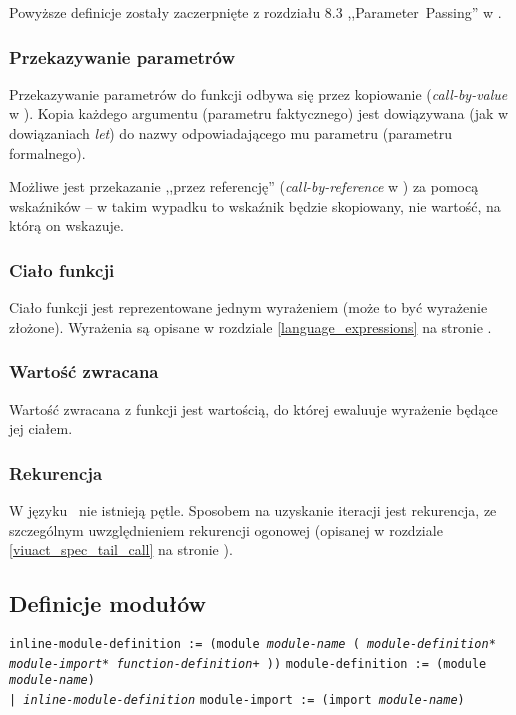 Powyższe definicje zostały zaczerpnięte z rozdziału 8.3 ,,Parameter~Passing'' w
\cite{ProgrammingLanguagePragmatics}.

\subsubsection{Przekazywanie parametrów}

Przekazywanie parametrów do funkcji odbywa się przez kopiowanie
(\emph{call-by-value} w \cite{ProgrammingLanguagePragmatics}). Kopia każdego
argumentu (parametru faktycznego) jest dowiązywana (jak w dowiązaniach
\emph{let}) do nazwy odpowiadającego mu parametru (parametru formalnego).

Możliwe jest przekazanie ,,przez referencję'' (\emph{call-by-reference} w
\cite{ProgrammingLanguagePragmatics}) za pomocą wskaźników -- w takim wypadku to
wskaźnik będzie skopiowany, nie wartość, na którą on wskazuje.

\subsubsection{Ciało funkcji}

Ciało funkcji jest reprezentowane jednym wyrażeniem (może to być wyrażenie
złożone). Wyrażenia są opisane w rozdziale \ref{language_expressions} na stronie
\pageref{language_expressions}.

\subsubsection{Wartość zwracana}

Wartość zwracana z funkcji jest wartością, do której ewaluuje wyrażenie będące
jej ciałem.

\subsubsection{Rekurencja}

W języku \ViuAct\ nie istnieją pętle. Sposobem na uzyskanie iteracji jest
rekurencja, ze szczególnym uwzględnieniem rekurencji ogonowej (opisanej w
rozdziale \ref{viuact_spec_tail_call} na stronie
\pageref{viuact_spec_tail_call}).

\subsection{Definicje modułów}
\label{viuact_spec_module_definition}

\texttt{inline-module-definition := (module \emph{module-name} (
\newline
\phantom{inline-module-definition := ~}\emph{module-definition}*
\newline
\phantom{inline-module-definition := ~}\emph{module-import}*
\newline
\phantom{inline-module-definition := ~}\emph{function-definition}+
))}
\newline
\texttt{module-definition := (module \emph{module-name}) \\
\phantom{module-definition :}| \emph{inline-module-definition}}
\newline
\texttt{module-import := (import \emph{module-name})}
\newline

